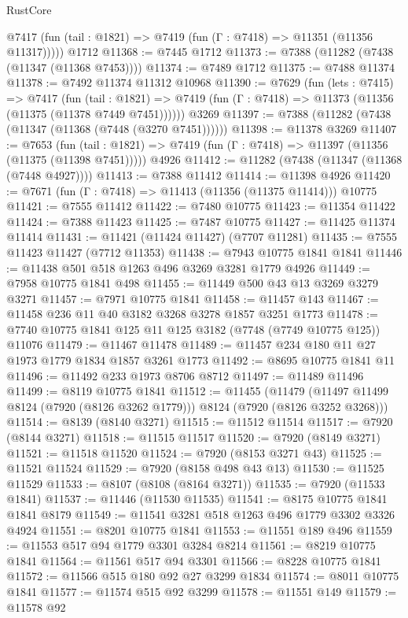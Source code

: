 \begin{lexlean}{RustCore}
\begin{coremodule}
      @7417 (fun (tail : @1821) => @7419 (fun (Γ : @7418) => @11351 (@11356 @11317)))))
    @1712
@11368 := @7445 @1712
@11373 := @7388 (@11282 (@7438 (@11347 (@11368 @7453))))
@11374 := @7489 @1712
@11375 := @7488 @11374
@11378 := @7492 @11374 @11312 @10968
@11390 := @7629
    (fun (lets : @7415) =>
    @7417
      (fun (tail : @1821) =>
      @7419 (fun (Γ : @7418) => @11373 (@11356 (@11375 (@11378 @7449 @7451))))))
    @3269
@11397 := @7388 (@11282 (@7438 (@11347 (@11368 (@7448 (@3270 @7451))))))
@11398 := @11378 @3269
@11407 := @7653
    (fun (tail : @1821) => @7419 (fun (Γ : @7418) => @11397 (@11356 (@11375 (@11398 @7451)))))
    @4926
@11412 := @11282 (@7438 (@11347 (@11368 (@7448 @4927))))
@11413 := @7388 @11412
@11414 := @11398 @4926
@11420 := @7671 (fun (Γ : @7418) => @11413 (@11356 (@11375 @11414))) @10775
@11421 := @7555 @11412
@11422 := @7480 @10775
@11423 := @11354 @11422
@11424 := @7388 @11423
@11425 := @7487 @10775
@11427 := @11425 @11374 @11414
@11431 := @11421 (@11424 @11427) (@7707 @11281)
@11435 := @7555 @11423 @11427 (@7712 @11353)
@11438 := @7943 @10775 @1841 @1841
@11446 := @11438 @501 @518 @1263 @496 @3269 @3281 @1779 @4926
@11449 := @7958 @10775 @1841 @498
@11455 := @11449 @500 @43 @13 @3269 @3279 @3271
@11457 := @7971 @10775 @1841
@11458 := @11457 @143
@11467 := @11458 @236 @11 @40 @3182 @3268 @3278 @1857 @3251 @1773
@11478 := @7740 @10775 @1841 @125 @11 @125 @3182 (@7748 (@7749 @10775 @125)) @11076
@11479 := @11467 @11478
@11489 := @11457 @234 @180 @11 @27 @1973 @1779 @1834 @1857 @3261 @1773
@11492 := @8695 @10775 @1841 @11
@11496 := @11492 @233 @1973 @8706 @8712
@11497 := @11489 @11496
@11499 := @8119 @10775 @1841
@11512 := @11455
    (@11479 (@11497 @11499 @8124 (@7920 (@8126 @3262 @1779))) @8124 (@7920 (@8126 @3252 @3268)))
@11514 := @8139 (@8140 @3271)
@11515 := @11512 @11514
@11517 := @7920 (@8144 @3271)
@11518 := @11515 @11517
@11520 := @7920 (@8149 @3271)
@11521 := @11518 @11520
@11524 := @7920 (@8153 @3271 @43)
@11525 := @11521 @11524
@11529 := @7920 (@8158 @498 @43 @13)
@11530 := @11525 @11529
@11533 := @8107 (@8108 (@8164 @3271))
@11535 := @7920 (@11533 @1841)
@11537 := @11446 (@11530 @11535)
@11541 := @8175 @10775 @1841 @1841 @8179
@11549 := @11541 @3281 @518 @1263 @496 @1779 @3302 @3326 @4924
@11551 := @8201 @10775 @1841
@11553 := @11551 @189 @496
@11559 := @11553 @517 @94 @1779 @3301 @3284 @8214
@11561 := @8219 @10775 @1841
@11564 := @11561 @517 @94 @3301
@11566 := @8228 @10775 @1841
@11572 := @11566 @515 @180 @92 @27 @3299 @1834
@11574 := @8011 @10775 @1841
@11577 := @11574 @515 @92 @3299
@11578 := @11551 @149
@11579 := @11578 @92

\end{coremodule}
\end{lexlean}
